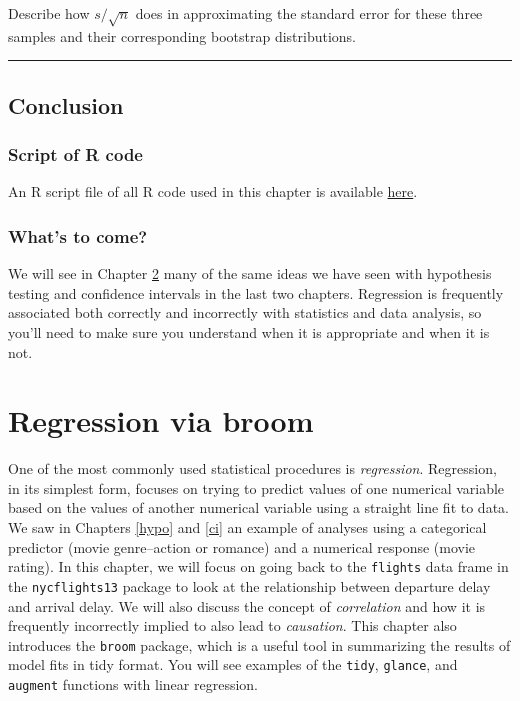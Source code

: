 \documentclass[]{tufte-book}
\let\oldrule=\rule
\renewcommand{\rule}[1]{\oldrule{\linewidth}}
\begin{document}
Describe how \(s / \sqrt{n}\) does in approximating the standard error
for these three samples and their corresponding bootstrap distributions.

\begin{center}\rule{0.5\linewidth}{\linethickness}\end{center}

\section{Conclusion}\label{conclusion-4}

\subsection{Script of R code}\label{script-of-r-code-4}

An R script file of all R code used in this chapter is available
\href{http://ismayc.github.io/moderndiver-book/scripts/08-ci.R}{here}.

\subsection{What's to come?}\label{whats-to-come-5}

We will see in Chapter \ref{regress} many of the same ideas we have seen
with hypothesis testing and confidence intervals in the last two
chapters. Regression is frequently associated both correctly and
incorrectly with statistics and data analysis, so you'll need to make
sure you understand when it is appropriate and when it is not.

\chapter{Regression via broom}\label{regress}

One of the most commonly used statistical procedures is
\emph{regression}. Regression, in its simplest form, focuses on trying
to predict values of one numerical variable based on the values of
another numerical variable using a straight line fit to data. We saw in
Chapters \ref{hypo} and \ref{ci} an example of analyses using a
categorical predictor (movie genre--action or romance) and a numerical
response (movie rating). In this chapter, we will focus on going back to
the \texttt{flights} data frame in the \texttt{nycflights13} package to
look at the relationship between departure delay and arrival delay. We
will also discuss the concept of \emph{correlation} and how it is
frequently incorrectly implied to also lead to \emph{causation}. This
chapter also introduces the \texttt{broom} package, which is a useful
tool in summarizing the results of model fits in tidy format. You will
see examples of the \texttt{tidy}, \texttt{glance}, and \texttt{augment}
functions with linear regression.
\end{document}

